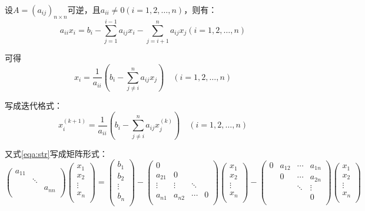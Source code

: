 \documentclass[UTF8,a4paper,11pt,oneside]{ctexbook}
\begin{document}
设\(A=(a_{ij})_{n\times n}\)可逆，且\(a_{ii}\neq0(i=1,2,\ldots,n)\)，则有：
\begin{equation}
    a_{ii}x_i=b_i-\sum\limits_{j=1}^{i-1}a_{ij}x_i-\sum\limits_{j=i+1}^na_{ij}x_j(i=1,2,\ldots,n)\label{eqa:str}
\end{equation}

可得
\[
x_i=\frac{1}{a_{ii}}\left(b_i-\sum_{j\neq i}^na_{ij}x_j\right)\quad(i=1,2,\ldots,n)
\]

写成迭代格式：
\[
x_i^{(k+1)}=\frac{1}{a_{ii}}\left(b_i-\sum_{j\neq i}^na_{ij}x_j^{(k)}\right)\quad(i=1,2,\ldots,n)
\]

又式\ref{eqa:str}写成矩阵形式：
\[
\begin{pmatrix}
    a_{11} & &\\
    & \ddots &\\
    & & a_{nn}\\
\end{pmatrix}
\begin{pmatrix}
    x_1\\
    x_2\\
    \vdots\\
    x_n\\
\end{pmatrix}
=
\begin{pmatrix}
    b_1\\
    b_2\\
    \vdots\\
    b_n\\
\end{pmatrix}
-
\begin{pmatrix}
    0 & & &\\
    a_{21} & 0 & &\\
    \vdots & \vdots & \ddots &\\
    a_{n1} & a_{n2} & \cdots & 0\\
\end{pmatrix}
\begin{pmatrix}
    x_1\\
    x_2\\
    \vdots\\
    x_n\\
\end{pmatrix}
-
\begin{pmatrix}
    0 & a_{12} & \cdots & a_{1n}\\
    & 0 & \cdots & a_{2n}\\
    & & \ddots & \vdots\\
    & & & 0\\
\end{pmatrix}
\begin{pmatrix}
    x_1\\
    x_2\\
    \vdots\\
    x_n\\
\end{pmatrix}
\]
\end{document}
